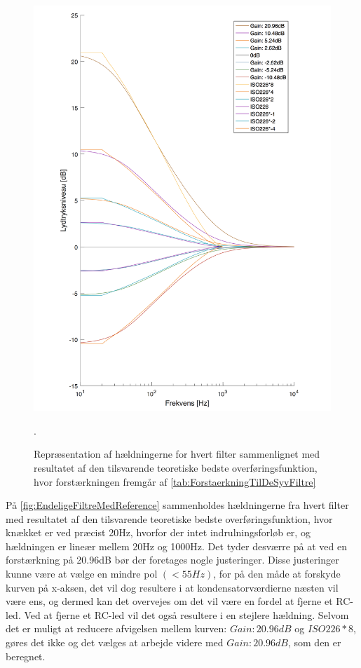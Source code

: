 \begin{figure}[H]
	\centering
	\includegraphics[resolution=300,width=\textwidth]{Figure/DesignAfFilter/EndeligeFiltreMedReferenceSHORT.pdf}
	\caption{Repræsentation af hældningerne for hvert filter sammenlignet med resultatet af den tilsvarende teoretiske bedste overføringsfunktion, hvor forstærkningen fremgår af \autoref{tab:ForstaerkningTilDeSyvFiltre}}.
	\label{fig:EndeligeFiltreMedReference}
\end{figure}
\noindent
%
På \autoref{fig:EndeligeFiltreMedReference} sammenholdes hældningerne fra hvert filter med resultatet af den tilsvarende teoretiske bedste overføringsfunktion, hvor knækket er ved præcist 20Hz, hvorfor der intet indrulningsforløb er, og hældningen er lineær mellem 20Hz og 1000Hz. Det tyder desværre på at ved en forstærkning på 20.96dB bør der foretages nogle justeringer. Disse justeringer kunne være at vælge en mindre pol $(<55Hz)$, for på den måde at forskyde kurven på x-aksen, det vil dog resultere i at kondensatorværdierne næsten vil være ens, og dermed kan det overvejes om det vil være en fordel at fjerne et RC-led. Ved at fjerne et RC-led vil det også resultere i en stejlere hældning. Selvom det er muligt at reducere afvigelsen mellem kurven: $Gain: 20.96dB$ og $ISO226*8$, gøres det ikke og det vælges at arbejde videre med $Gain: 20.96dB$, som den er beregnet.  
